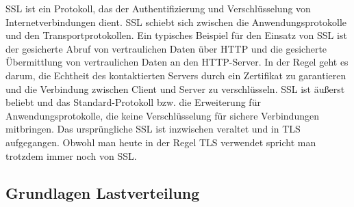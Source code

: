 \documentclass[letterpaper, 12pt]{article}
\let\tempsubsection\subsection
\renewcommand\subsection[1]{\vspace{0cm}\tempsubsection{#1}\vspace{0cm}}
\begin{document}
SSL ist ein Protokoll, das der Authentifizierung und Verschlüsselung von Internetverbindungen dient. SSL schiebt sich zwischen die Anwendungsprotokolle und den Transportprotokollen. Ein typisches Beispiel für den Einsatz von SSL ist der gesicherte Abruf von vertraulichen Daten über HTTP und die gesicherte Übermittlung von vertraulichen Daten an den HTTP-Server. In der Regel geht es darum, die Echtheit des kontaktierten Servers durch ein Zertifikat zu garantieren und die Verbindung zwischen Client und Server zu verschlüsseln.
SSL ist äußerst beliebt und das Standard-Protokoll bzw. die Erweiterung für Anwendungsprotokolle, die keine Verschlüsselung für sichere Verbindungen mitbringen. Das ursprüngliche SSL ist inzwischen veraltet und in TLS aufgegangen. Obwohl man heute in der Regel TLS verwendet spricht man trotzdem immer noch von SSL. \cite{tls}

\subsection{Grundlagen Lastverteilung}
\end{document}
